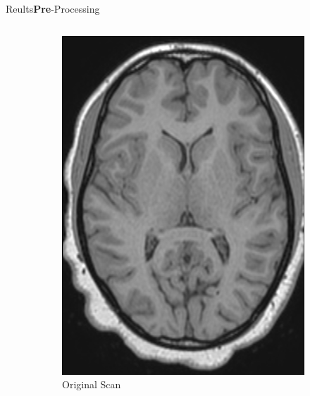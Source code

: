 \documentclass[]{standalone}
\begin{document}
\begin{frame}{Reults}{\textbf{Pre}-Processing}
\begin{columns}
		\begin{column}{0.55\textwidth}
			\begin{figure}[h!]
			\footnotesize
			\centering
				\begin{subfigure}[h!]{0.32\textwidth}
				     \includegraphics[scale=0.1085]{./IMG/T1W54_2.png}
				     \caption*{Original Scan} 
				\end{subfigure}
				\hfill
				\begin{subfigure}[h!]{0.32\textwidth}

\end{subfigure}
\end{figure}
\end{column}
\end{columns}
\end{frame}
\end{document}
